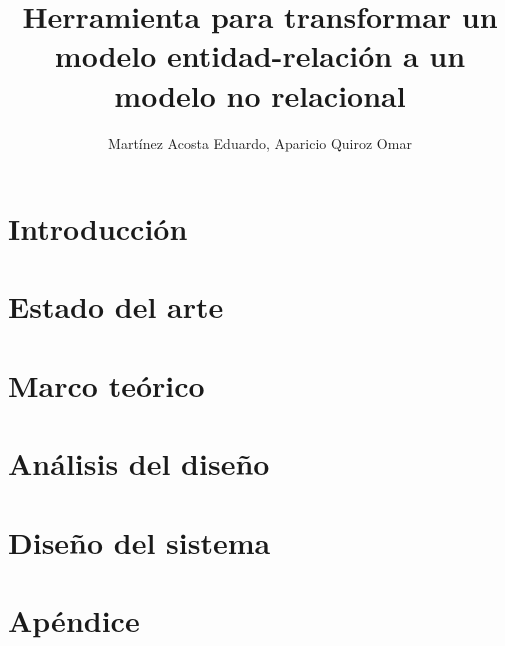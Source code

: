 \documentclass[12pt, a4paper]{report}
\title{Herramienta para transformar un modelo entidad-relación a un modelo no relacional}
\author{Martínez Acosta Eduardo, Aparicio Quiroz Omar}
\theoremstyle{definition}
\theoremstyle{remark}
\begin{document}


\tableofcontents
\listoffigures
\listoftables


\chapter{Introducción}

\chapter{Estado del arte}

\chapter{Marco teórico}

\chapter{Análisis del diseño}

\chapter{Diseño del sistema}
%
% 
\appendix
\chapter{Apéndice}


\printbibliography
\end{document}
